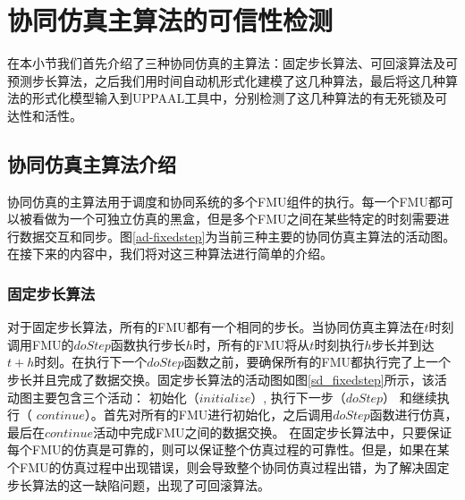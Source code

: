\section{协同仿真主算法的可信性检测}
在本小节我们首先介绍了三种协同仿真的主算法：固定步长算法\cite{Bastian2011Master}、可回滚算法及可预测步长算法\cite{Broman2013Determinate}，之后我们用时间自动机形式化建模了这几种算法，最后将这几种算法的形式化模型输入到UPPAAL工具中，分别检测了这几种算法的有无死锁及可达性和活性。
\subsection{协同仿真主算法介绍}
协同仿真的主算法用于调度和协同系统的多个FMU组件的执行。每一个FMU都可以被看做为一个可独立仿真的黑盒，但是多个FMU之间在某些特定的时刻需要进行数据交互和同步。图\ref{ad-fixedstep}为当前三种主要的协同仿真主算法的活动图。在接下来的内容中，我们将对这三种算法进行简单的介绍。
\begin{figure}[htbp]
\end{figure}
\subsubsection{固定步长算法}
对于固定步长算法，所有的FMU都有一个相同的步长。当协同仿真主算法在$t$时刻调用FMU的$doStep$函数执行步长$h$时，所有的FMU将从$t$时刻执行$h$步长并到达$t+h$时刻。在执行下一个$doStep$函数之前，要确保所有的FMU都执行完了上一个步长并且完成了数据交换。固定步长算法的活动图如图\ref{sd_fixedstep}所示，该活动图主要包含三个活动： 初始化（$initialize$）, 执行下一步（$doStep$） 和继续执行（ $continue$）。首先对所有的FMU进行初始化，之后调用$doStep$函数进行仿真，最后在$continue$活动中完成FMU之间的数据交换。 在固定步长算法中，只要保证每个FMU的仿真是可靠的，则可以保证整个仿真过程的可靠性。但是，如果在某个FMU的仿真过程中出现错误，则会导致整个协同仿真过程出错，为了解决固定步长算法的这一缺陷问题，出现了可回滚算法。
